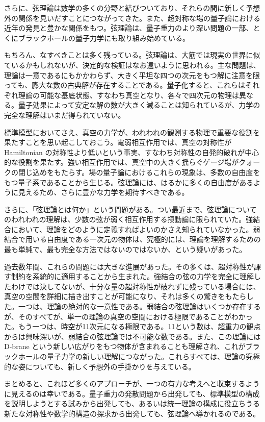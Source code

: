さらに、弦理論は数学の多くの分野と結びついており、それらの間に新しく予想外の関係を見いだすことにつながってきた。また、超対称な場の量子論における近年の発見と豊かな関係をもつ。弦理論は、量子重力のより深い問題の一部、とくにブラックホールの量子力学にも取り組み始めている。

もちろん、なすべきことは多く残っている。弦理論は、大筋では現実の世界に似ているかもしれないが、決定的な検証はなお遠いように思われる。主な問題は、理論は一意であるにもかかわらず、大きく平坦な四つの次元をもつ解に注意を限っても、膨大な数の古典解が存在することである。量子化すると、これらはそれぞれ理論の可能な基底状態、すなわち真空となり、各々で四次元の物理は異なる。量子効果によって安定な解の数が大きく減ることは知られているが、力学の完全な理解はいまだ得られていない。

標準模型においてさえ、真空の力学が、われわれの観測する物理で重要な役割を果たすことを思い起こしておこう。電弱相互作用では、真空の対称性が Hamiltonian の対称性より低いという事実、すなわち対称性の自発的破れが中心的な役割を果たす。強い相互作用では、真空中の大きく揺らぐゲージ場がクォークの閉じ込めをもたらす。場の量子論におけるこれらの現象は、多数の自由度をもつ量子系であることから生じる。弦理論には、はるかに多くの自由度があるように見えるため、さらに豊かな力学を期待すべきである。

さらに、「弦理論とは何か」という問題がある。つい最近まで、弦理論についてのわれわれの理解は、少数の弦が弱く相互作用する摂動論に限られていた。強結合において、理論をどのように定義すればよいのかさえ知られていなかった。弱結合で用いる自由度である一次元の物体は、究極的には、理論を理解するための最も単純で、最も完全な方法ではないのではないか、という疑いがあった。

過去数年間、これらの問題には大きな進展があった。その多くは、超対称性が課す制約を系統的に適用することから生まれた。強結合の弦の力学を完全に理解したわけでは決してないが、十分な量の超対称性が破れずに残っている場合には、真空の空間を詳細に描き出すことが可能になり、それは多くの驚きをもたらした。一つは、理論の絶対的な一意性である。弱結合の弦理論はいくつか存在するが、そのすべてが、単一の理論の真空の空間における極限であることがわかった。もう一つは、時空が11次元になる極限である。11という数は、超重力の観点からは興味深いが、弱結合の弦理論では不可能な数である。また、この理論には D-brane という新しい広がりをもつ物体が含まれることも理解され、これがブラックホールの量子力学の新しい理解につながった。これらすべては、理論の究極的な姿についても、新しく予想外の手掛かりを与えている。

まとめると、これほど多くのアプローチが、一つの有力な考えへと収束するように見えるのは幸いである。量子重力の発散問題から出発しても、標準模型の構成を説明しようとする試みから出発しても、あるいは統一理論の構成に役立ちうる新たな対称性や数学的構造の探求から出発しても、弦理論へ導かれるのである。

